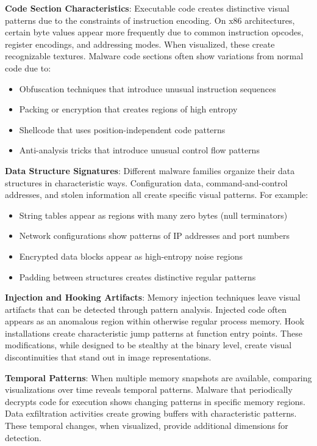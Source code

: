 \textbf{Code Section Characteristics}: Executable code creates distinctive visual patterns due to the constraints of instruction encoding. On x86 architectures, certain byte values appear more frequently due to common instruction opcodes, register encodings, and addressing modes. When visualized, these create recognizable textures. Malware code sections often show variations from normal code due to:

\begin{itemize}
    \item Obfuscation techniques that introduce unusual instruction sequences
    \item Packing or encryption that creates regions of high entropy
    \item Shellcode that uses position-independent code patterns
    \item Anti-analysis tricks that introduce unusual control flow patterns
\end{itemize}

\textbf{Data Structure Signatures}: Different malware families organize their data structures in characteristic ways. Configuration data, command-and-control addresses, and stolen information all create specific visual patterns. For example:

\begin{itemize}
    \item String tables appear as regions with many zero bytes (null terminators)
    \item Network configurations show patterns of IP addresses and port numbers
    \item Encrypted data blocks appear as high-entropy noise regions
    \item Padding between structures creates distinctive regular patterns
\end{itemize}

\textbf{Injection and Hooking Artifacts}: Memory injection techniques leave visual artifacts that can be detected through pattern analysis. Injected code often appears as an anomalous region within otherwise regular process memory. Hook installations create characteristic jump patterns at function entry points. These modifications, while designed to be stealthy at the binary level, create visual discontinuities that stand out in image representations.

\textbf{Temporal Patterns}: When multiple memory snapshots are available, comparing visualizations over time reveals temporal patterns. Malware that periodically decrypts code for execution shows changing patterns in specific memory regions. Data exfiltration activities create growing buffers with characteristic patterns. These temporal changes, when visualized, provide additional dimensions for detection.


